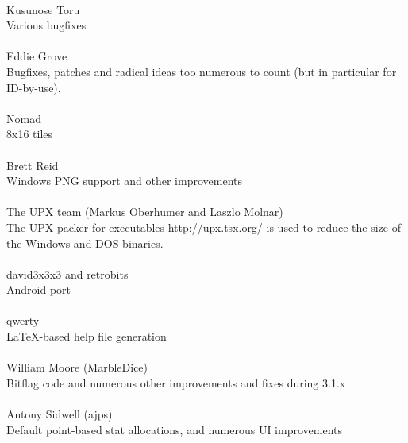 \paragraph{}
Kusunose Toru \\
Various bugfixes

\paragraph{}
Eddie Grove \\
Bugfixes, patches and radical ideas too numerous to count (but in particular
for ID-by-use).

\paragraph{}
Nomad \\
8x16 tiles

\paragraph{}
Brett Reid \\
Windows PNG support and other improvements

\paragraph{}
The UPX team (Markus Oberhumer and Laszlo Molnar) \\
The UPX packer for executables \url{http://upx.tsx.org/} is used to reduce
the size of the Windows and DOS binaries.

\paragraph{}
david3x3x3 and retrobits \\
Android port

\paragraph{}
qwerty \\
LaTeX-based help file generation

\paragraph{}
William Moore (MarbleDice) \\
Bitflag code and numerous other improvements and fixes during 3.1.x

\paragraph{}
Antony Sidwell (ajps) \\
Default point-based stat allocations, and numerous UI improvements
